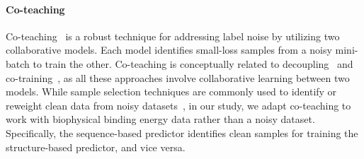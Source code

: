 \paragraph{Co-teaching}
%
Co-teaching~\cite{han2018co, yuan2024importance, chen2024parallel} is a robust technique for addressing label noise by utilizing two collaborative models. Each model identifies small-loss samples from a noisy mini-batch to train the other. Co-teaching is conceptually related to decoupling~\cite{malach2017decoupling} and co-training~\cite{blum1998combining}, as all these approaches involve collaborative learning between two models. 
%
While sample selection techniques are commonly used to identify or reweight clean data from noisy datasets~\cite{ren2018learning, chen2021generalized, chen2022gradient}, in our study, we adapt co-teaching to work with biophysical binding energy data rather than a noisy dataset. Specifically, the sequence-based predictor identifies clean samples for training the structure-based predictor, and vice versa.
%
